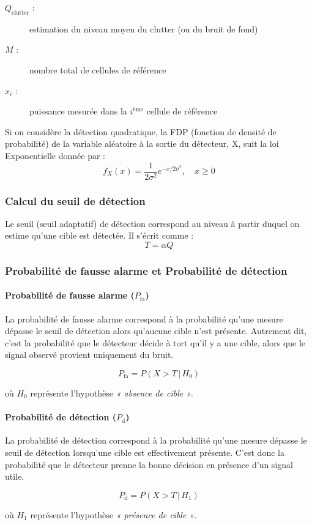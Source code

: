 \begin{description}
  \item[${Q}_{\text{clutter}}$ :] estimation du niveau moyen du clutter (ou du bruit de fond)
  \item[$M$ :] nombre total de cellules de référence
  \item[$x_i$ :] puissance mesurée dans la $i^{\text{ème}}$ cellule de référence
\end{description}

Si on considère la détection quadratique, la FDP (fonction de densité de probabilité) de la variable aléatoire à la sortie du détecteur, X, suit
la loi Exponentielle donnée par :
\begin{equation}
f_X(x) = \frac{1}{2\sigma^2} e^{-x / 2\sigma^2}, \quad x \ge 0
\end{equation}


\subsubsection{Calcul du seuil de détection}

Le seuil (seuil adaptatif) de détection correspond au niveau à partir duquel on estime qu'une cible est détectée. Il s'écrit comme : 
\begin{equation}
T = \alpha Q
\end{equation}

\subsubsection{Probabilité de fausse alarme et Probabilité de détection}

\paragraph{Probabilité de fausse alarme (\(P_{\text{fa}}\))}  
La probabilité de fausse alarme correspond à la probabilité qu'une mesure dépasse le seuil de détection alors qu'aucune cible n'est présente.  
Autrement dit, c'est la probabilité que le détecteur décide à tort qu'il y a une cible, alors que le signal observé provient uniquement du bruit.

\[
P_{\text{fa}} = P(X > T \,|\, H_0)
\]

où \( H_0 \) représente l'hypothèse \textit{« absence de cible »}.

\vspace{1em}

\paragraph{Probabilité de détection (\(P_{\text{d}}\))}  
La probabilité de détection correspond à la probabilité qu'une mesure dépasse le seuil de détection lorsqu'une cible est effectivement présente.  
C'est donc la probabilité que le détecteur prenne la bonne décision en présence d'un signal utile.

\[
P_{\text{d}} = P(X > T \,|\, H_1)
\]

où \( H_1 \) représente l'hypothèse \textit{« présence de cible »}.
